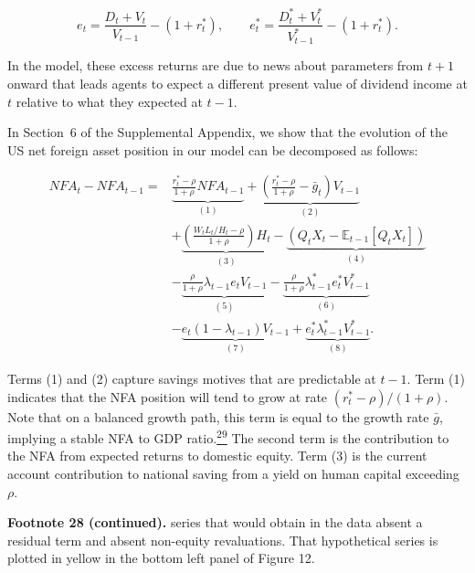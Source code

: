 \documentclass[11pt]{article}
\begin{document}
\[
e_t=\frac{D_t+V_t}{V_{t-1}}-(1+r_t^*),\qquad e_t^*=\frac{D_t^*+V_t^*}{V_{t-1}^*}-(1+r_t^*).
\]


In the model, these excess returns are due to news about parameters from $t+1$ onward that leads agents to expect a different present value of dividend income at $t$ relative to what they expected at $t-1$.


In Section 6 of the Supplemental Appendix, we show that the evolution of the US net foreign asset position in our model can be decomposed as follows:


\setcounter{equation}{26}
\begin{equation}\label{eq:27}
\begin{aligned}
NFA_t-NFA_{t-1}={}&\underbrace{\frac{r_t^*-\rho}{1+\rho}NFA_{t-1}}_{(1)}
+\underbrace{\left(\frac{r_t^*-\rho}{1+\rho}-\bar g_t\right)V_{t-1}}_{(2)}\\
&+\underbrace{\left(\frac{W_tL_t/H_t-\rho}{1+\rho}\right)H_t}_{(3)}
-\underbrace{\left(Q_tX_t-\mathbb{E}_{t-1}[Q_tX_t]\right)}_{(4)}\\
&-\underbrace{\frac{\rho}{1+\rho}\lambda_{t-1}e_tV_{t-1}}_{(5)}
-\underbrace{\frac{\rho}{1+\rho}\lambda_{t-1}^*e_t^*V_{t-1}^*}_{(6)}\\
&-\underbrace{e_t(1-\lambda_{t-1})V_{t-1}}_{(7)}
+\underbrace{e_t^*\lambda_{t-1}^*V_{t-1}^*}_{(8)}.
\end{aligned}
\end{equation}


Terms (1) and (2) capture savings motives that are predictable at $t-1$. Term (1) indicates that the NFA position will tend to grow at rate $(r_{t}^{*}-\rho )/(1+\rho )$. Note that on a balanced growth path, this term is equal to the growth rate $\bar{g}$, implying a stable NFA to GDP ratio.\hyperlink{fn:29}{\textsuperscript{29}} The second term is the contribution to the NFA from expected returns to domestic equity. Term (3) is the current account contribution to national saving from a yield on human capital exceeding $\rho $.


{\footnotesize\textbf{Footnote 28 (continued).} series that would obtain in the data absent a residual term and absent non-equity revaluations. That hypothetical series is plotted in yellow in the bottom left panel of Figure 12.\par}
\end{document}
